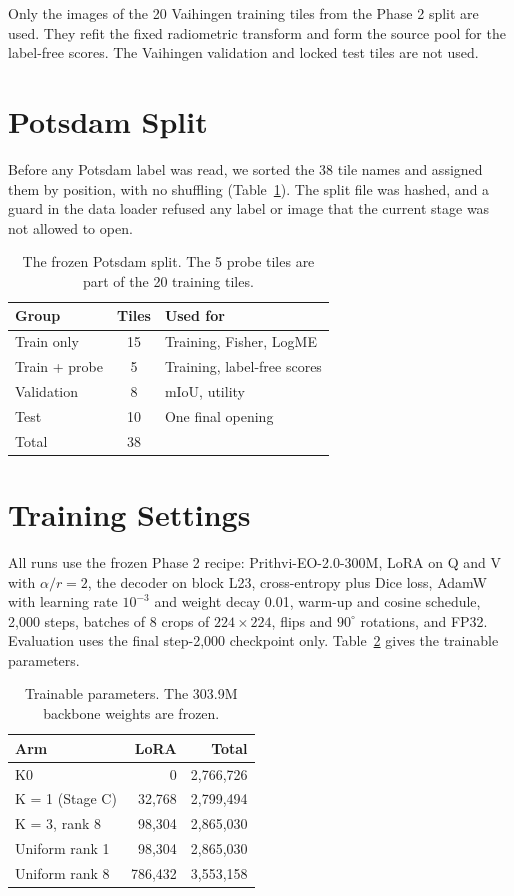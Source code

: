 \documentclass[11pt,a4paper]{report}
\begin{document}
Only the images of the 20 Vaihingen training tiles from the Phase 2 split are used. They refit the fixed radiometric transform and form the source pool for the label-free scores. The Vaihingen validation and locked test tiles are not used.

\section{Potsdam Split}

Before any Potsdam label was read, we sorted the 38 tile names and assigned them by position, with no shuffling (Table~\ref{tab:split}). The split file was hashed, and a guard in the data loader refused any label or image that the current stage was not allowed to open.

\begin{table}[t]
\centering
\caption{The frozen Potsdam split. The 5 probe tiles are part of the 20 training tiles.}
\label{tab:split}
\small
\begin{tabular}{@{}lcl@{}}
\toprule
\textbf{Group} & \textbf{Tiles} & \textbf{Used for} \\
\midrule
Train only & 15 & Training, Fisher, LogME \\
Train + probe & 5 & Training, label-free scores \\
Validation & 8 & mIoU, utility \\
Test & 10 & One final opening \\
\midrule
Total & 38 & \\
\bottomrule
\end{tabular}
\end{table}

\section{Training Settings}

All runs use the frozen Phase 2 recipe: Prithvi-EO-2.0-300M, LoRA on Q and V with $\alpha / r = 2$, the decoder on block L23, cross-entropy plus Dice loss, AdamW with learning rate $10^{-3}$ and weight decay 0.01, warm-up and cosine schedule, 2,000 steps, batches of 8 crops of $224 \times 224$, flips and $90^\circ$ rotations, and FP32. Evaluation uses the final step-2,000 checkpoint only. Table~\ref{tab:params} gives the trainable parameters.

\begin{table}[t]
\centering
\caption{Trainable parameters. The 303.9M backbone weights are frozen.}
\label{tab:params}
\small
\setlength{\tabcolsep}{4pt}
\begin{tabular}{@{}lrr@{}}
\toprule
\textbf{Arm} & \textbf{LoRA} & \textbf{Total} \\
\midrule
K0 & 0 & 2,766,726 \\
K = 1 (Stage C) & 32,768 & 2,799,494 \\
K = 3, rank 8 & 98,304 & 2,865,030 \\
Uniform rank 1 & 98,304 & 2,865,030 \\
Uniform rank 8 & 786,432 & 3,553,158 \\
\bottomrule
\end{tabular}
\end{table}
\end{document}
